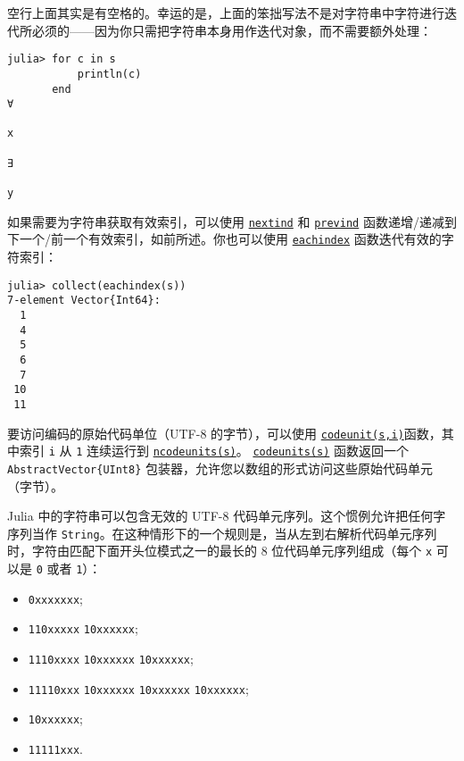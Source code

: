 空行上面其实是有空格的。幸运的是，上面的笨拙写法不是对字符串中字符进行迭代所必须的——因为你只需把字符串本身用作迭代对象，而不需要额外处理：




\begin{verbatim}
julia> for c in s
           println(c)
       end
∀

x

∃

y
\end{verbatim}



如果需要为字符串获取有效索引，可以使用 \hyperlink{7455293228649070526}{\texttt{nextind}} 和 \hyperlink{15871508897466976220}{\texttt{prevind}} 函数递增/递减到下一个/前一个有效索引，如前所述。你也可以使用 \hyperlink{4701773772897287974}{\texttt{eachindex}} 函数迭代有效的字符索引：




\begin{verbatim}
julia> collect(eachindex(s))
7-element Vector{Int64}:
  1
  4
  5
  6
  7
 10
 11
\end{verbatim}



要访问编码的原始代码单位（UTF-8 的字节），可以使用 \hyperlink{16983098119361955361}{\texttt{codeunit(s,i)}}函数，其中索引 \texttt{i} 从 \texttt{1} 连续运行到 \hyperlink{1775518749150675445}{\texttt{ncodeunits(s)}}。 \hyperlink{17283482973786973382}{\texttt{codeunits(s)}} 函数返回一个 \texttt{AbstractVector\{UInt8\}} 包装器，允许您以数组的形式访问这些原始代码单元（字节）。



Julia 中的字符串可以包含无效的 UTF-8 代码单元序列。这个惯例允许把任何字序列当作 \texttt{String}。在这种情形下的一个规则是，当从左到右解析代码单元序列时，字符由匹配下面开头位模式之一的最长的 8 位代码单元序列组成（每个 \texttt{x} 可以是 \texttt{0} 或者 \texttt{1}）：



\begin{itemize}
\item \texttt{0xxxxxxx};


\item \texttt{110xxxxx} \texttt{10xxxxxx};


\item \texttt{1110xxxx} \texttt{10xxxxxx} \texttt{10xxxxxx};


\item \texttt{11110xxx} \texttt{10xxxxxx} \texttt{10xxxxxx} \texttt{10xxxxxx};


\item \texttt{10xxxxxx};


\item \texttt{11111xxx}.

\end{itemize}



